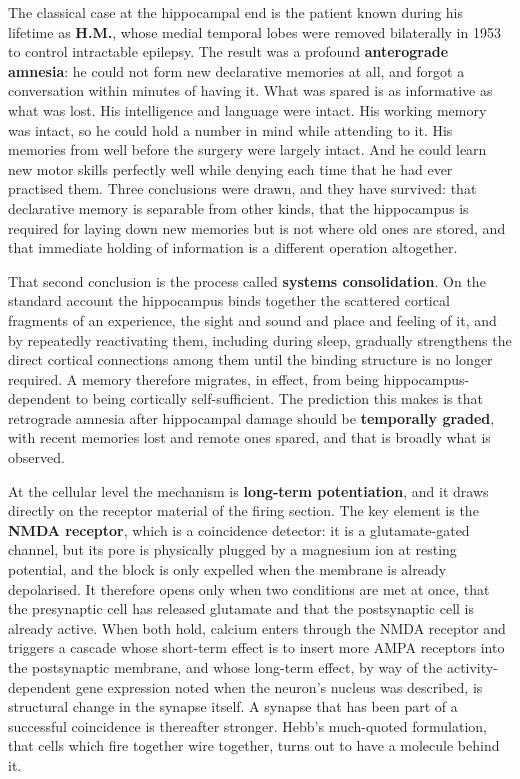\documentclass[11pt]{article}
\begin{document}
The classical case at the hippocampal end is the patient known during his lifetime as \textbf{H.M.}, whose medial temporal lobes were removed bilaterally in 1953 to control intractable epilepsy. The result was a profound \textbf{anterograde amnesia}: he could not form new declarative memories at all, and forgot a conversation within minutes of having it. What was spared is as informative as what was lost. His intelligence and language were intact. His working memory was intact, so he could hold a number in mind while attending to it. His memories from well before the surgery were largely intact. And he could learn new motor skills perfectly well while denying each time that he had ever practised them. Three conclusions were drawn, and they have survived: that declarative memory is separable from other kinds, that the hippocampus is required for laying down new memories but is not where old ones are stored, and that immediate holding of information is a different operation altogether.

That second conclusion is the process called \textbf{systems consolidation}. On the standard account the hippocampus binds together the scattered cortical fragments of an experience, the sight and sound and place and feeling of it, and by repeatedly reactivating them, including during sleep, gradually strengthens the direct cortical connections among them until the binding structure is no longer required. A memory therefore migrates, in effect, from being hippocampus-dependent to being cortically self-sufficient. The prediction this makes is that retrograde amnesia after hippocampal damage should be \textbf{temporally graded}, with recent memories lost and remote ones spared, and that is broadly what is observed.

At the cellular level the mechanism is \textbf{long-term potentiation}, and it draws directly on the receptor material of the firing section. The key element is the \textbf{NMDA receptor}, which is a coincidence detector: it is a glutamate-gated channel, but its pore is physically plugged by a magnesium ion at resting potential, and the block is only expelled when the membrane is already depolarised. It therefore opens only when two conditions are met at once, that the presynaptic cell has released glutamate and that the postsynaptic cell is already active. When both hold, calcium enters through the NMDA receptor and triggers a cascade whose short-term effect is to insert more AMPA receptors into the postsynaptic membrane, and whose long-term effect, by way of the activity-dependent gene expression noted when the neuron's nucleus was described, is structural change in the synapse itself. A synapse that has been part of a successful coincidence is thereafter stronger. Hebb's much-quoted formulation, that cells which fire together wire together, turns out to have a molecule behind it.
\end{document}
